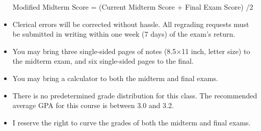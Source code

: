 \documentclass[11pt]{article}
\begin{document}
\begin{itemize}
\quad Modified Midterm Score =  (Current Midterm Score + Final Exam Score) /2
\vspace{-2.5mm}\item Clerical errors will be corrected without hassle. All regrading requests must be 
submitted in writing within one week (7 days) of the exam's return. %
\vspace{-2.5mm}\item You may bring three single-sided pages of notes (8.5$\times$11 inch, letter size) to the midterm exam, and six single-sided pages to the final.
\vspace{-2.5mm}\item You may bring a calculator to both the midterm and final exams. 
\vspace{-2.5mm} \item There is no predetermined grade distribution for this class. The recommended average GPA for this course is between 3.0 and 3.2. 
\vspace{-2.5mm} \item I reserve the right to curve the grades of both the midterm and final exams. 

\end{itemize}
%
\end{document}
